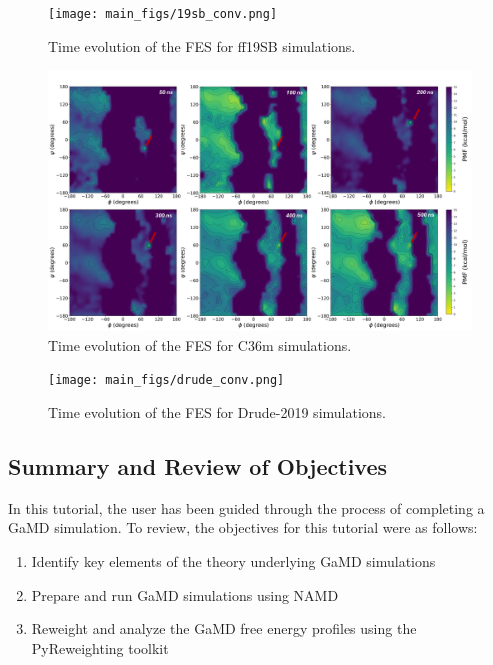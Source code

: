 \documentclass[9pt,tutorial]{livecoms}
\begin{document}
\begin{figure}
    \texttt{[image: main\_figs/19sb\_conv.png]}
    \caption{Time evolution of the FES for ff19SB simulations.}
    \label{fig:19sb_conv}
\end{figure}

\begin{figure}
    \includegraphics[scale=0.62]{main_figs/c36_conv.png}
    \caption{Time evolution of the FES for C36m simulations.}
    \label{fig:c36_conv}
\end{figure}

\begin{figure}[h]
    \texttt{[image: main\_figs/drude\_conv.png]}
    \caption{Time evolution of the FES for Drude-2019 simulations.}
    \label{fig:drude_conv}
\end{figure}


\subsection{Summary and Review of Objectives}
In this tutorial, the user has been guided through the process of completing a GaMD simulation. To review, the objectives for this tutorial were as follows: 

\begin{enumerate}
    \item Identify key elements of the theory underlying GaMD simulations
    \item Prepare and run GaMD simulations using NAMD
    \item Reweight and analyze the GaMD free energy profiles using the PyReweighting toolkit
\end{enumerate}
\end{document}
